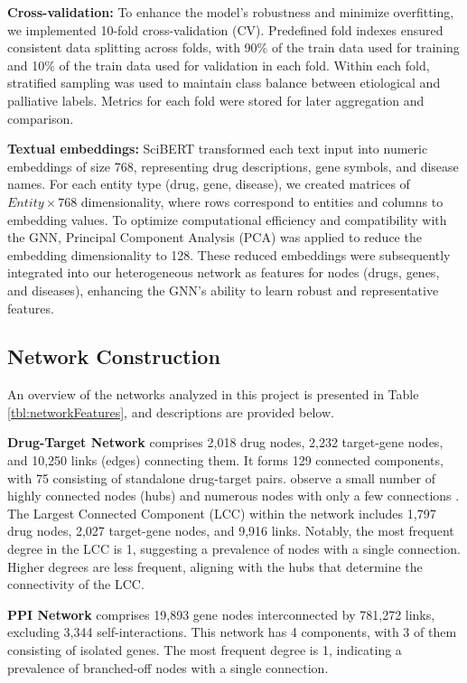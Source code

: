 \documentclass[journal,twoside,web]{ieeecolor}
\begin{document}
\textbf{Cross-validation:}
To enhance the model's robustness and minimize overfitting, we implemented 10-fold cross-validation (CV). 
Predefined fold indexes ensured consistent data splitting across folds, with 90\% of the train data used for training and 10\% of the train data used for validation in each fold.
Within each fold, stratified sampling was used to maintain class balance between etiological and palliative labels. 
Metrics for each fold were stored for later aggregation and comparison.

\textbf{Textual embeddings:}
SciBERT transformed each text input into numeric embeddings of size 768, representing drug descriptions, gene symbols, and disease names.
For each entity type (drug, gene, disease), we created matrices of $Entity \times 768$ dimensionality, where rows correspond to entities and columns to embedding values. 
To optimize computational efficiency and compatibility with the GNN, Principal Component Analysis (PCA) was applied to reduce the embedding dimensionality to 128. 
These reduced embeddings were subsequently integrated into our heterogeneous network as features for nodes (drugs, genes, and diseases), enhancing the GNN’s ability to learn robust and representative features.

\subsection{Network Construction}
\label{sec:network_construction_2}

An overview of the networks analyzed in this project is presented in Table \ref{tbl:networkFeatures}, and descriptions are provided below.

\textbf{Drug-Target Network}
comprises 2,018 drug nodes, 2,232 target-gene nodes, and 10,250 links (edges) connecting them.
It forms 129 connected components, with 75 consisting of standalone drug-target pairs.
observe a small number of highly connected nodes (hubs) and numerous nodes with only a few connections \cite{barabasi2009scale}.
The Largest Connected Component (LCC) within the network includes 1,797 drug nodes, 2,027 target-gene nodes, and 9,916 links.
Notably, the most frequent degree in the LCC is 1, suggesting a prevalence of nodes with a single connection.
Higher degrees are less frequent, aligning with the hubs that determine the connectivity of the LCC.

\textbf{PPI Network}
comprises 19,893 gene nodes interconnected by 781,272 links, excluding 3,344 self-interactions.
This network has 4 components, with 3 of them consisting of isolated genes.
The most frequent degree is 1, indicating a prevalence of branched-off nodes with a single connection.
\end{document}

